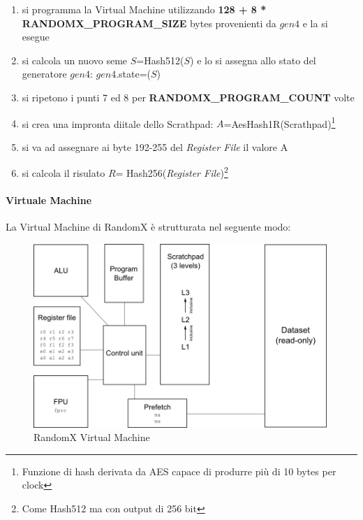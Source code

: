 \documentclass[12pt,a4paper]{article}
\begin{document}
\begin{enumerate}
    \item si programma la Virtual Machine utilizzando \textbf{128 + 8 *
    RANDOMX\_PROGRAM\_SIZE} bytes provenienti da $gen4$ e la si esegue

    \item si calcola un nuovo seme $S$=Hash512($S$) e lo si assegna allo stato
    del generatore $gen4$: $gen4$.state=($S$)

    \item si ripetono i punti 7 ed 8 per \textbf{RANDOMX\_PROGRAM\_COUNT} volte
    
    \item si crea una impronta diitale dello Scrathpad:
    $A$=AesHash1R(Scrathpad)\footnote{Funzione di hash derivata da AES capace di
    produrre più di 10 bytes per clock}

    \item si va ad assegnare ai byte 192-255 del \textit{Register File} il
    valore A

    \item si calcola il risulato $ R $= Hash256(\textit{Register
    File})\footnote{Come Hash512 ma con output di 256 bit}

\end{enumerate}

\paragraph{Virtuale Machine}
La Virtual Machine di RandomX è strutturata nel seguente modo:

\begin{figure}[ht]
    \centering
    \includegraphics[width=0.99\textwidth]{./images/vm_randomX.png}
    \caption{RandomX Virtual Machine}
    \label{fig:vm_randomX}
\end{figure}
\end{document}
